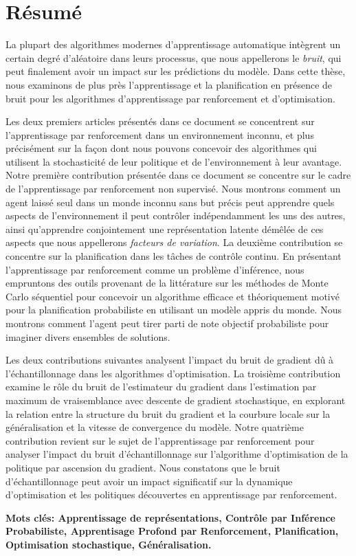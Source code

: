 \chapter*{R\'{e}sum\'{e}}
La plupart des algorithmes modernes d'apprentissage automatique intègrent un
certain degré d'aléatoire dans leurs processus, que nous appellerons le
\emph{bruit}, qui peut finalement avoir un impact sur les prédictions du modèle. Dans cette thèse, nous examinons de plus près l'apprentissage et la planification en présence de bruit pour les algorithmes d'apprentissage par renforcement et d'optimisation.

Les deux premiers articles présentés dans ce document se concentrent sur l'apprentissage par renforcement dans un environnement inconnu, et plus précisément sur la façon dont nous pouvons concevoir des algorithmes qui utilisent la stochasticité de leur politique et de l'environnement à leur avantage.
Notre première contribution présentée dans ce document se concentre sur le cadre
de l'apprentissage par renforcement non supervisé. Nous montrons comment un
agent laissé seul dans un monde inconnu sans but précis peut apprendre quels
aspects de l'environnement il peut contrôler indépendamment les uns des autres,
ainsi qu'apprendre conjointement une représentation latente démêlée de ces
aspects que nous appellerons \emph{facteurs de variation}.
La deuxième contribution se concentre sur la planification dans les tâches de
contrôle continu. En présentant l'apprentissage par renforcement comme un
problème d'inférence, nous empruntons des outils provenant de la littérature sur
les m\'{e}thodes de Monte Carlo séquentiel pour concevoir un algorithme efficace
et théoriquement motiv\'{e} pour la planification probabiliste en utilisant un
modèle appris du monde. Nous montrons comment l'agent peut tirer parti de note
objectif probabiliste pour imaginer divers ensembles de solutions.

Les deux contributions suivantes analysent l'impact du bruit de gradient dû à l'échantillonnage dans les algorithmes d'optimisation. 
La troisième contribution examine le rôle du bruit de l'estimateur du gradient dans l'estimation par maximum de vraisemblance avec descente de gradient stochastique, en explorant la relation entre la structure du bruit du gradient et la courbure locale sur la généralisation et la vitesse de convergence du modèle. 
Notre quatrième contribution revient sur le sujet de l'apprentissage par
renforcement pour analyser l'impact du bruit d'échantillonnage sur l'algorithme
d'optimisation de la politique par ascension du gradient. Nous constatons que le
bruit d'échantillonnage peut avoir un impact significatif sur la dynamique
d'optimisation et les politiques découvertes en apprentissage par
renforcement.


  {\bfseries Mots cl\'{e}s: Apprentissage de repr\'{e}sentations,
  Contr\^{o}le par Inf\'{e}rence Probabiliste, Apprentisage Profond par
  Renforcement, Planification, Optimisation stochastique,
G\'{e}n\'{e}ralisation.}
                                                                                                                                                            
